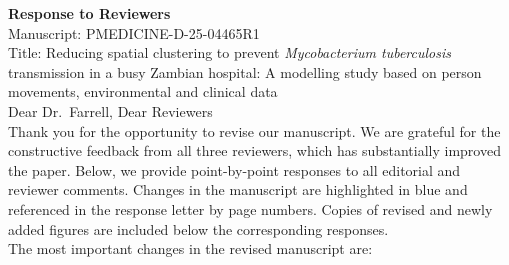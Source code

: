\documentclass[11pt]{article}
\begin{document}
\noindent\textbf{\Large Response to Reviewers}\\[0.5em]
\noindent Manuscript: PMEDICINE-D-25-04465R1\\
\noindent Title: Reducing spatial clustering to prevent \emph{Mycobacterium tuberculosis} transmission in a busy Zambian hospital: A modelling study based on person movements, environmental and clinical data\\[1em]

\noindent Dear Dr.\ Farrell, Dear Reviewers\\[0.5em]

\noindent Thank you for the opportunity to revise our manuscript. We are grateful for the constructive feedback from all three reviewers, which has substantially improved the paper. Below, we provide point-by-point responses to all editorial and reviewer comments. Changes in the manuscript are highlighted in blue and referenced in the response letter by page numbers. Copies of revised and newly added figures are included below the corresponding responses.\\[0.5em]

\noindent The most important changes in the revised manuscript are:
\end{document}
